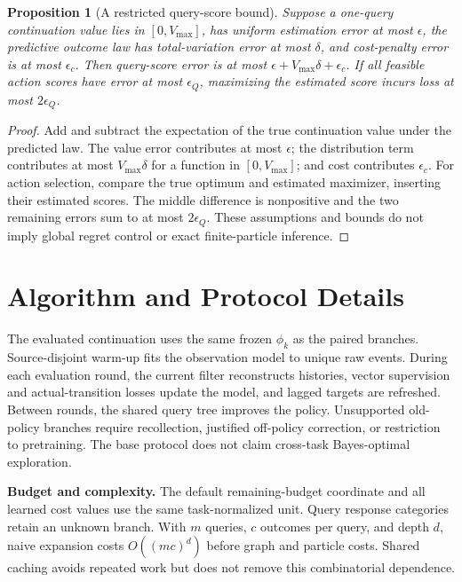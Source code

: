 \documentclass[sigconf,anonymous,review]{acmart}
\theoremstyle{zhplain}
\newtheorem{proposition}{命题}
\newtheorem{proposition}{Proposition}
\begin{document}
\begin{proposition}[A restricted query-score bound]
Suppose a one-query continuation value lies in \([0,V_{\max}]\), has uniform estimation error at most \(\epsilon\), the predictive outcome law has total-variation error at most \(\delta\), and cost-penalty error is at most \(\epsilon_c\). Then query-score error is at most \(\epsilon+V_{\max}\delta+\epsilon_c\). If all feasible action scores have error at most \(\epsilon_Q\), maximizing the estimated score incurs loss at most \(2\epsilon_Q\).
\end{proposition}
\begin{proof}
Add and subtract the expectation of the true continuation value under the predicted law. The value error contributes at most \(\epsilon\); the distribution term contributes at most \(V_{\max}\delta\) for a function in \([0,V_{\max}]\); and cost contributes \(\epsilon_c\). For action selection, compare the true optimum and estimated maximizer, inserting their estimated scores. The middle difference is nonpositive and the two remaining errors sum to at most \(2\epsilon_Q\). These assumptions and bounds do not imply global regret control or exact finite-particle inference.
\end{proof}

\section{Algorithm and Protocol Details}
\label{app:details}



The evaluated continuation uses the same frozen \(\phi_k\) as the paired branches. Source-disjoint warm-up fits the observation model to unique raw events. During each evaluation round, the current filter reconstructs histories, vector supervision and actual-transition losses update the model, and lagged targets are refreshed. Between rounds, the shared query tree improves the policy. Unsupported old-policy branches require recollection, justified off-policy correction, or restriction to pretraining. The base protocol does not claim cross-task Bayes-optimal exploration.

\textbf{Budget and complexity.} The default remaining-budget coordinate and all learned cost values use the same task-normalized unit. Query response categories retain an unknown branch. With \(m\) queries, \(c\) outcomes per query, and depth \(d\), naive expansion costs \(O((mc)^d)\) before graph and particle costs. Shared caching avoids repeated work but does not remove this combinatorial dependence. 
\end{document}
